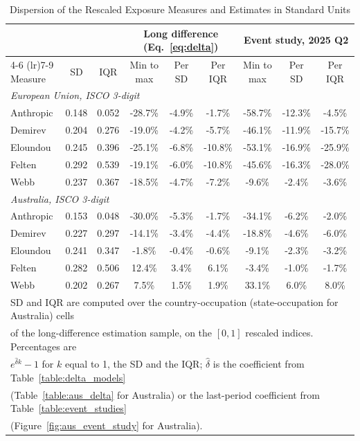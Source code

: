 \documentclass[11pt]{article}
\begin{document}
\begin{table}[htbp]
\centering
\footnotesize
\setlength{\tabcolsep}{4pt}
\caption{Dispersion of the Rescaled Exposure Measures and Estimates in Standard Units}
\begin{tabular}{lcccccccc}
\hline\hline
 & & & \multicolumn{3}{c}{Long difference (Eq.~\ref{eq:delta})} & \multicolumn{3}{c}{Event study, 2025 Q2} \\
\cmidrule(lr){4-6} \cmidrule(lr){7-9}
Measure & SD & IQR & Min to max & Per SD & Per IQR & Min to max & Per SD & Per IQR \\
\midrule
\multicolumn{9}{l}{\textit{European Union, ISCO 3-digit}} \\
Anthropic & 0.148 & 0.052 & -28.7\% & -4.9\% & -1.7\% & -58.7\% & -12.3\% & -4.5\% \\
Demirev & 0.204 & 0.276 & -19.0\% & -4.2\% & -5.7\% & -46.1\% & -11.9\% & -15.7\% \\
Eloundou & 0.245 & 0.396 & -25.1\% & -6.8\% & -10.8\% & -53.1\% & -16.9\% & -25.9\% \\
Felten & 0.292 & 0.539 & -19.1\% & -6.0\% & -10.8\% & -45.6\% & -16.3\% & -28.0\% \\
Webb & 0.237 & 0.367 & -18.5\% & -4.7\% & -7.2\% & -9.6\% & -2.4\% & -3.6\% \\
\midrule
\multicolumn{9}{l}{\textit{Australia, ISCO 3-digit}} \\
Anthropic & 0.153 & 0.048 & -30.0\% & -5.3\% & -1.7\% & -34.1\% & -6.2\% & -2.0\% \\
Demirev & 0.227 & 0.297 & -14.1\% & -3.4\% & -4.4\% & -18.8\% & -4.6\% & -6.0\% \\
Eloundou & 0.241 & 0.347 & -1.8\% & -0.4\% & -0.6\% & -9.1\% & -2.3\% & -3.2\% \\
Felten & 0.282 & 0.506 & 12.4\% & 3.4\% & 6.1\% & -3.4\% & -1.0\% & -1.7\% \\
Webb & 0.202 & 0.267 & 7.5\% & 1.5\% & 1.9\% & 33.1\% & 6.0\% & 8.0\% \\
\hline\hline
\multicolumn{9}{l}{\footnotesize SD and IQR are computed over the country-occupation (state-occupation for Australia) cells} \\
\multicolumn{9}{l}{\footnotesize of the long-difference estimation sample, on the $[0,1]$ rescaled indices. Percentages are} \\
\multicolumn{9}{l}{\footnotesize $e^{\hat{\delta} k} - 1$ for $k$ equal to 1, the SD and the IQR; $\hat{\delta}$ is the coefficient from Table~\ref{table:delta_models}} \\
\multicolumn{9}{l}{\footnotesize (Table~\ref{table:aus_delta} for Australia) or the last-period coefficient from Table~\ref{table:event_studies}} \\
\multicolumn{9}{l}{\footnotesize (Figure~\ref{fig:aus_event_study} for Australia).} \\
\end{tabular}
\label{table:exposure_dispersion}
\end{table}
\end{document}
